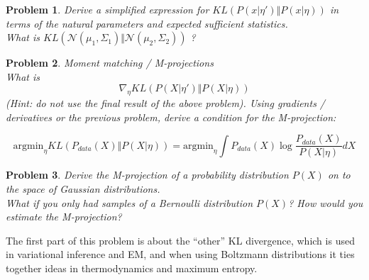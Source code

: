 \documentclass[a4paper]{article}
\newtheorem{problem}{Problem}[section]
\begin{document}
\begin{problem}
Derive a simplified expression for $ KL\left( P( x \vert \eta') \Vert P( x \vert \eta) \right)$ in terms of the natural parameters and expected sufficient statistics.  \\
What is $ KL\left( \mathcal{N} \left( \mu_1,\Sigma_1 \right) \Vert \mathcal{N} \left( \mu_2, \Sigma_2 \right) \right) $ ?
\end{problem}

\begin{problem}
Moment matching / M-projections \\
What is 
\begin{equation}
  \nabla_\eta KL\left( P( X \vert \eta') \Vert P( X \vert \eta) \right)
  \label{}
\end{equation}
(Hint: do not use the final result of the above problem).
Using gradients / derivatives or the previous problem, derive a condition for the M-projection:

\begin{equation}
  \text{argmin}_\eta KL \left( P_{data}(X) \Vert P( X \vert \eta) \right) = \text{argmin}_\eta \int P_{data}(X) \log \frac{ P_{data}(X) }{ P( X \vert \eta) } dX
  \label{}
\end{equation}
\end{problem}

\begin{problem}
  Derive the M-projection of a probability distribution $P(X)$ on to the space of Gaussian distributions.  \\
  What if you only had samples of a Bernoulli distribution $P(X)$?  How would you estimate the M-projection?
\end{problem}

The first part of this problem is about the ``other'' KL divergence, which is used in variational inference and EM, and when using Boltzmann distributions it ties together ideas in thermodynamics and maximum entropy.
\end{document}
